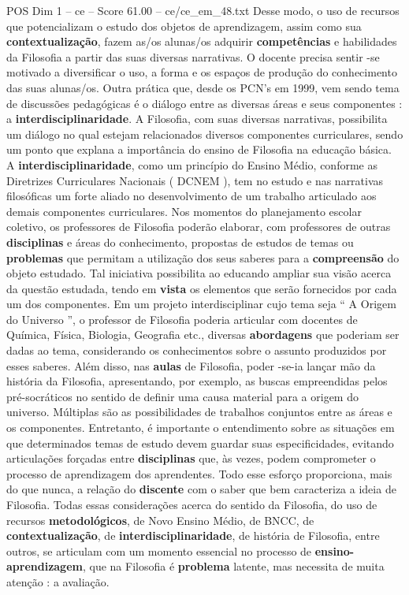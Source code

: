 \begin{textsample}{POS Dim 1 – ce – Score 61.00 – ce/ce\_em\_48.txt}
Desse modo, o uso de recursos que potencializam o estudo dos objetos de aprendizagem, assim como sua \textbf{contextualização}, fazem as/os alunas/os adquirir \textbf{competências} e habilidades da Filosofia a partir das suas diversas narrativas.
O docente precisa sentir -se motivado a diversificar o uso, a forma e os espaços de produção do conhecimento das suas alunas/os.
Outra prática que, desde os PCN’s em 1999, vem sendo tema de discussões pedagógicas é o diálogo entre as diversas áreas e seus componentes : a \textbf{interdisciplinaridade}.
A Filosofia, com suas diversas narrativas, possibilita um diálogo no qual estejam relacionados diversos componentes curriculares, sendo um ponto que explana a importância do ensino de Filosofia na educação básica.
A \textbf{interdisciplinaridade}, como um princípio do Ensino Médio, conforme as Diretrizes Curriculares Nacionais ( DCNEM ), tem no estudo e nas narrativas filosóficas um forte aliado no desenvolvimento de um trabalho articulado aos demais componentes curriculares.
Nos momentos do planejamento escolar coletivo, os professores de Filosofia poderão elaborar, com professores de outras \textbf{disciplinas} e áreas do conhecimento, propostas de estudos de temas ou \textbf{problemas} que permitam a utilização dos seus saberes para a \textbf{compreensão} do objeto estudado.
Tal iniciativa possibilita ao educando ampliar sua visão acerca da questão estudada, tendo em \textbf{vista} os elementos que serão fornecidos por cada um dos componentes.
Em um projeto interdisciplinar cujo tema seja “ A Origem do Universo ”, o professor de Filosofia poderia articular com docentes de Química, Física, Biologia, Geografia etc., diversas \textbf{abordagens} que poderiam ser dadas ao tema, considerando os conhecimentos sobre o assunto produzidos por esses saberes.
Além disso, nas \textbf{aulas} de Filosofia, poder -se-ia lançar mão da história da Filosofia, apresentando, por exemplo, as buscas empreendidas pelos pré-socráticos no sentido de definir uma causa material para a origem do universo.
Múltiplas são as possibilidades de trabalhos conjuntos entre as áreas e os componentes.
Entretanto, é importante o entendimento sobre as situações em que determinados temas de estudo devem guardar suas especificidades, evitando articulações forçadas entre \textbf{disciplinas} que, às vezes, podem comprometer o processo de aprendizagem dos aprendentes.
Todo esse esforço proporciona, mais do que nunca, a relação do \textbf{discente} com o saber que bem caracteriza a ideia de Filosofia.
Todas essas considerações acerca do sentido da Filosofia, do uso de recursos \textbf{metodológicos}, de Novo Ensino Médio, de BNCC, de \textbf{contextualização}, de \textbf{interdisciplinaridade}, de história de Filosofia, entre outros, se articulam com um momento essencial no processo de \textbf{ensino-aprendizagem}, que na Filosofia é \textbf{problema} latente, mas necessita de muita atenção : a avaliação.

\end{textsample}

